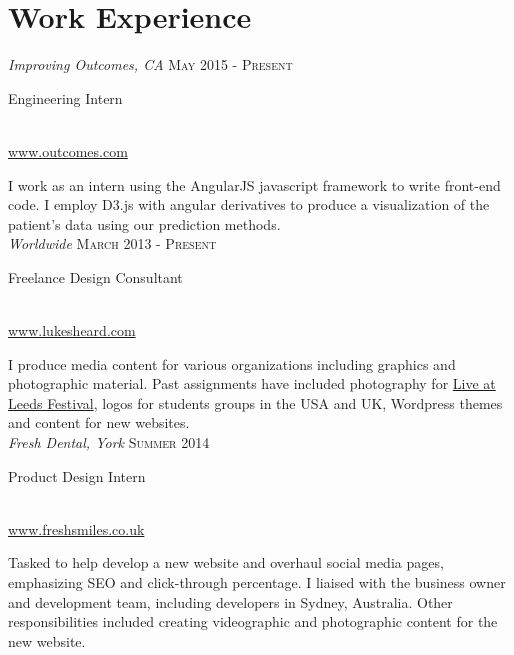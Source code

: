 \documentclass[10pt]{article}
\begin{document}
\begin{minipage}[t]{0.6\textwidth}
\vspace{0pt}

\section{Work Experience}

{\small{\textit{Improving Outcomes, CA} \hfill {\raggedleft\textsc{May 2015 - Present}}}} \\
{\raggedright\large {Engineering Intern}} \\
{\small{\href{http://www.outcomes.com}{www.outcomes.com}} \vspace{5pt}}

\normalsize{I work as an intern using the AngularJS javascript framework to write front-end code. I employ D3.js with angular derivatives to produce a visualization of the patient's data using our prediction methods. }\\

{\small{\textit{Worldwide} \hfill {\raggedleft\textsc{March 2013 - Present}}}} \\
{\raggedright\large {Freelance Design Consultant}} \\
{\small{\href{http://www.lukesheard.com}{www.lukesheard.com}} \vspace{5pt}}

\normalsize{I produce media content for various organizations including graphics and photographic material. Past assignments have included photography for \href{http://www.liveatleeds.com}{Live at Leeds Festival}, logos for students groups in the USA and UK, Wordpress themes and content for new websites. }\\

{\small{\textit{Fresh Dental, York} \hfill {\raggedleft\textsc{Summer 2014}}}} \\
{\raggedright\large {Product Design Intern}} \\
{\small{\href{http://www.freshsmiles.co.uk}{www.freshsmiles.co.uk}} \vspace{5pt}}

\normalsize{Tasked to help develop a new website and overhaul social media pages, emphasizing SEO and click-through percentage. I liaised with the business owner and development team, including developers in Sydney, Australia. Other responsibilities included creating videographic and photographic content for the new website.} \\



\end{minipage}
\end{document}
